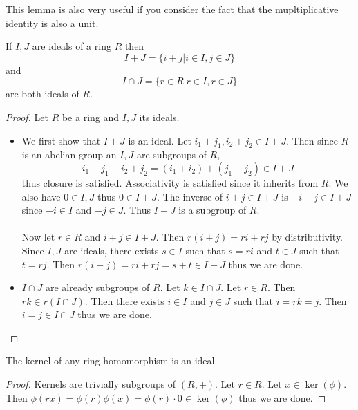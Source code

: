 \documentclass[a4paper]{article}
\begin{document}
This lemma is also very useful if you consider the fact that the mupltiplicative identity is also a unit. 

\begin{prp}{}{} If $I,J$ are ideals of a ring $R$ then $$I+J=\{i+j|i\in I,j\in J\}$$ and $$I\cap J=\{r\in R|r\in I,r\in J\}$$ are both ideals of $R$. \tcbline
\begin{proof}
Let $R$ be a ring and $I,J$ its ideals. 
\begin{itemize}
\item We first show that $I+J$ is an ideal. Let $i_1+j_1,i_2+j_2\in I+J$. Then since $R$ is an abelian group an $I,J$ are subgroups of $R$, $$i_1+j_1+i_2+j_2=(i_1+i_2)+(j_1+j_2)\in I+J$$ thus closure is satisfied. Associativity is satisfied since it inherits from $R$. We also have $0\in I,J$ thus $0\in I+J$. The inverse of $i+j\in I+J$ is $-i-j\in I+J$ since $-i\in I$ and $-j\in J$. Thus $I+J$ is a subgroup of $R$. \\~\\
Now let $r\in R$ and $i+j\in I+J$. Then $r(i+j)=ri+rj$ by distributivity. Since $I,J$ are ideals, there exists $s\in I$ such that $s=ri$ and $t\in J$ such that $t=rj$. Then $r(i+j)=ri+rj=s+t\in I+J$ thus we are done. 
\item $I\cap J$ are already subgroups of $R$. Let $k\in I\cap J$. Let $r\in R$. Then $rk\in r(I\cap J)$. Then there exists $i\in I$ and $j\in J$ such that $i=rk=j$. Then $i=j\in I\cap J$ thus we are done. 
\end{itemize}
\end{proof}
\end{prp}

\begin{prp}{}{} The kernel of any ring homomorphism is an ideal. \tcbline
\begin{proof}
Kernels are trivially subgroups of $(R,+)$. Let $r\in R$. Let $x\in\ker(\phi)$. Then $\phi(rx)=\phi(r)\phi(x)=\phi(r)\cdot 0\in\ker(\phi)$ thus we are done. 
\end{proof}
\end{prp}
\end{document}
